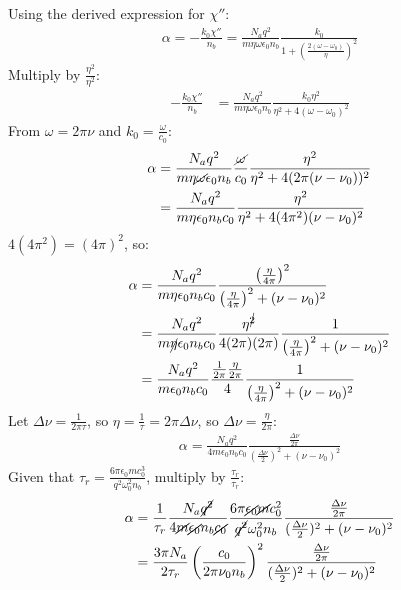 \documentclass[11pt]{article}
\begin{document}
Using the derived expression for $\chi''$:
\begin{align*}
    \alpha = -\frac{k_0\chi''}{n_b} = \frac{N_a q^2}{m \eta \omega \epsilon_0 n_b} \frac{k_0}{1+ \left( \frac{2(\omega - \omega_0)}{\eta} \right)^2}
\end{align*}
Multiply by $\frac{\eta^2}{\eta^2}$:
\begin{align*}
    -\frac{k_0\chi''}{n_b} &= \frac{N_a q^2}{m \eta \omega \epsilon_0 n_b} \frac{k_0 \eta^2}{\eta^2 + 4(\omega - \omega_0)^2}
\end{align*}
From $\omega = 2 \pi \nu$ and $k_0 = \frac{\omega}{c_0}$:
\begin{align*}
    \alpha &= \frac{N_a q^2}{m \eta \cancel{\omega} \epsilon_0 n_b} \frac{\cancel{\omega}}{c_0} \frac{\eta^2}{\eta^2 + 4(2 \pi (\nu - \nu_0))^2} \\
    &= \frac{N_a q^2}{m \eta \epsilon_0 n_b c_0} \frac{\eta^2}{\eta^2 + 4 (4 \pi^2)(\nu - \nu_0)^2}
\end{align*}
$4(4 \pi^2) = (4 \pi)^2$, so:
\begin{align*}
    \alpha &= \frac{N_a q^2}{m \eta \epsilon_0 n_b c_0} \frac{\left( \frac{\eta}{4 \pi} \right) ^2}{\left( \frac{\eta}{4 \pi} \right) ^2 + (\nu - \nu_0)^2} \\
    &= \frac{N_a q^2}{m \cancel{\eta} \epsilon_0 n_b c_0} \frac{\eta^{\cancel{2}}}{4(2 \pi)(2 \pi)} \frac{1}{\left( \frac{\eta}{4 \pi} \right) ^2 + (\nu - \nu_0)^2} \\
    &= \frac{N_a q^2}{m \epsilon_0 n_b c_0} \frac{\frac{1}{2 \pi} \frac{\eta}{2 \pi}}{4} \frac{1}{\left( \frac{\eta}{4 \pi} \right) ^2 + (\nu - \nu_0)^2}
\end{align*}
Let $\Delta \nu = \frac{1}{2 \pi \tau}$, so $\eta = \frac{1}{\tau} = 2 \pi \Delta \nu$, so $\Delta \nu = \frac{\eta}{2 \pi}$:
\begin{align*}
    \alpha = \frac{N_a q^2}{4m \epsilon_0 n_b c_0} \frac{\frac{\Delta \nu}{2 \pi}}{(\frac{\Delta \nu}{2})^2 + (\nu - \nu_0)^2}
\end{align*} 
Given that $\tau_r = \frac{6 \pi \epsilon_0 m c_0^3}{q^2 \omega_0^2 n_b}$, multiply by $\frac{\tau_r}{\tau_r}$:
\begin{align*}
    \alpha &= \frac{1}{\tau_r} \frac{N_a \cancel{q^2}}{4 \cancel{m} \cancel{\epsilon_0} n_b \cancel{c_0}} \frac{6 \pi \cancel{\epsilon_0} \cancel{m} c_0^{2}}{\cancel{q^2} \omega_0^2 n_b} \frac{\frac{\Delta \nu}{2 \pi}}{(\frac{\Delta \nu}{2})^2 + (\nu - \nu_0)^2} \\
    &= \frac{3 \pi N_a}{2 \tau_r} \left( \frac{c_0}{2 \pi \nu_0 n_b} \right)^2 \frac{\frac{\Delta \nu}{2 \pi}}{(\frac{\Delta \nu}{2})^2 + (\nu - \nu_0)^2}
\end{align*}
\end{document}
